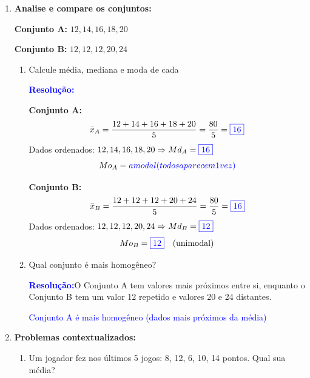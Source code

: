 \documentclass[11pt]{article}
\newcommand{\respostaNum}[1]{\textcolor{blue}{\boxed{#1}}}
\newcommand{\respostaTxt}[1]{\textcolor{blue}{#1}}
\newcommand{\resolucao}{\textbf{\textcolor{blue}{Resolução:}}}
\begin{document}
\begin{multicols}{2}
\begin{enumerate}[leftmargin=*]
\begin{enumerate}[label=\alph*)]
\item As alturas de 4 amigos são: 165, 170, 175, 180 cm. Qual a média de altura?

\resolucao
\[
\bar{x} = \frac{165 + 170 + 175 + 180}{4} = \frac{690}{4} = \respostaNum{172,5 \text{ cm}}
\]

\item Se Maria tira notas 5, 6, 7, qual deve ser sua 4ª nota para ter média 6,5?

\resolucao Seja $x$ a 4ª nota:
\[
\frac{5 + 6 + 7 + x}{4} = 6,5
\]
\[
18 + x = 26 \Rightarrow x = \respostaNum{8}
\]
\end{enumerate}

\item \textbf{Analise e compare os conjuntos:}

\textbf{Conjunto A:} $12, 14, 16, 18, 20$

\textbf{Conjunto B:} $12, 12, 12, 20, 24$

\begin{enumerate}[label=\alph*)]
\item Calcule média, mediana e moda de cada

\resolucao

\textbf{Conjunto A:}
\[
\bar{x}_A = \frac{12+14+16+18+20}{5} = \frac{80}{5} = \respostaNum{16}
\]
Dados ordenados: $12, 14, 16, 18, 20 \Rightarrow Md_A = \respostaNum{16}$
\[
Mo_A = \respostaTxt{amodal (todos aparecem 1 vez)}
\]

\textbf{Conjunto B:}
\[
\bar{x}_B = \frac{12+12+12+20+24}{5} = \frac{80}{5} = \respostaNum{16}
\]
Dados ordenados: $12, 12, 12, 20, 24 \Rightarrow Md_B = \respostaNum{12}$
\[
Mo_B = \respostaNum{12} \quad \text{(unimodal)}
\]

\item Qual conjunto é mais homogêneo?

\resolucao O Conjunto A tem valores mais próximos entre si, enquanto o Conjunto B tem um valor 12 repetido e valores 20 e 24 distantes.

\respostaTxt{Conjunto A é mais homogêneo (dados mais próximos da média)}
\end{enumerate}

\item \textbf{Problemas contextualizados:}

\begin{enumerate}[label=\alph*)]
\item Um jogador fez nos últimos 5 jogos: 8, 12, 6, 10, 14 pontos. Qual sua média?


\end{enumerate}
\end{enumerate}
\end{multicols}
\end{document}
